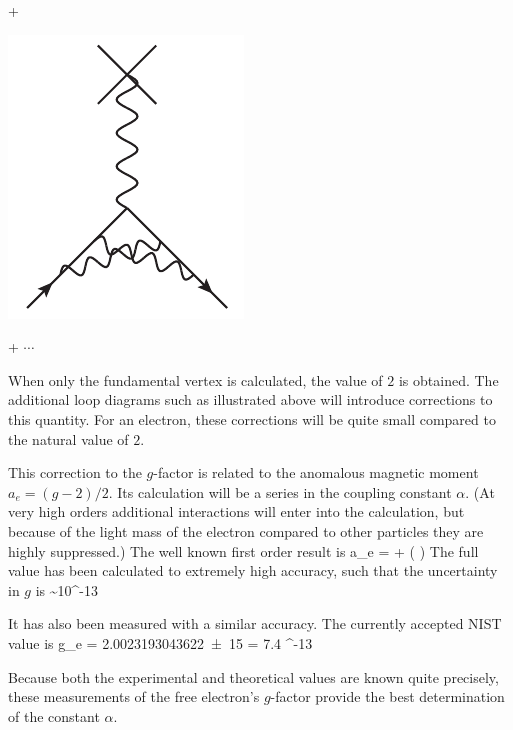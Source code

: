 {\begin{minipage}{1in}
\end{minipage}
+
\begin{minipage}{1in}
   \begin{center} \includegraphics[scale=0.5]{eps/QEDloop2} \end{center} 
\end{minipage}
+ \hspace{2em} $\cdots$
 }
 
When only the fundamental vertex is calculated, the value of $2$ is obtained.  The additional loop diagrams such as illustrated above will introduce corrections to this quantity.  For an electron, these corrections will be quite small compared to the natural value of $2$.  
 
 
 
 This correction to the $g$-factor is related to the anomalous magnetic moment $a_e = (g-2)/2$.  Its calculation will be a series in the coupling constant $\alpha$.   (At very high orders additional interactions will enter into the calculation, but because of the light mass of the electron compared to other particles they are highly suppressed.)  The well known first order result is
 \beq
 	a_e = \frac{\alpha}{2\pi} + ( )
 \eeq
The full value has been calculated to extremely high accuracy, such that the uncertainty in $g$ is 
\beq
	 \sim 10^{-13}
\eeq

It has also been measured with a similar accuracy.  The currently accepted NIST value \cite{RevModPhys.80.633} is 
\beq
	g_e = \num{2.002 319 304 3622(15)}    \hspace{2em} \delta = 7.4 ^{-13}
\eeq

Because both the experimental and theoretical values are known quite precisely, these measurements of the free electron's $g$-factor provide the best determination of the constant $\alpha$.  

